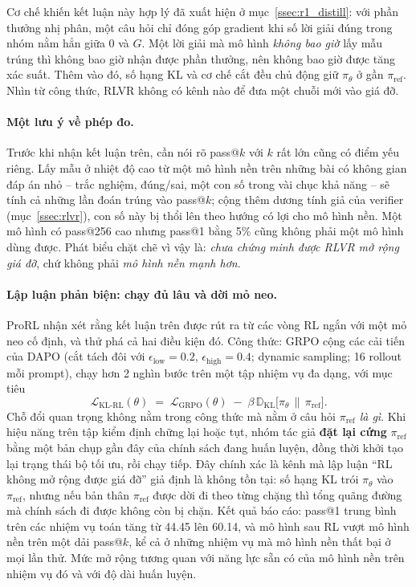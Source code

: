 Cơ chế khiến kết luận này hợp lý đã xuất hiện ở mục~\ref{ssec:r1_distill}: với phần thưởng nhị phân, một câu hỏi chỉ đóng góp gradient khi số lời giải đúng trong nhóm nằm hẳn giữa 0 và $G$. Một lời giải mà mô hình \emph{không bao giờ} lấy mẫu trúng thì không bao giờ nhận được phần thưởng, nên không bao giờ được tăng xác suất. Thêm vào đó, số hạng KL và cơ chế cắt đều chủ động giữ $\pi_\theta$ ở gần $\pi_{\mathrm{ref}}$. Nhìn từ công thức, RLVR không có kênh nào để đưa một chuỗi mới vào giá đỡ.

\paragraph{Một lưu ý về phép đo.}
Trước khi nhận kết luận trên, cần nói rõ pass@$k$ với $k$ rất lớn cũng có điểm yếu riêng. Lấy mẫu ở nhiệt độ cao từ một mô hình nền trên những bài có không gian đáp án nhỏ -- trắc nghiệm, đúng/sai, một con số trong vài chục khả năng -- sẽ tính cả những lần đoán trúng vào pass@$k$; cộng thêm dương tính giả của verifier (mục~\ref{ssec:rlvr}), con số này bị thổi lên theo hướng có lợi cho mô hình nền. Một mô hình có pass@256 cao nhưng pass@1 bằng 5\% cũng không phải một mô hình dùng được. Phát biểu chặt chẽ vì vậy là: \emph{chưa chứng minh được RLVR mở rộng giá đỡ}, chứ không phải \emph{mô hình nền mạnh hơn}.

\paragraph{Lập luận phản biện: chạy đủ lâu và dời mỏ neo.}
ProRL \cite{liu2025prorl} nhận xét rằng kết luận trên được rút ra từ các vòng RL ngắn với một mỏ neo cố định, và thử phá cả hai điều kiện đó. Công thức: GRPO cộng các cải tiến của DAPO (cắt tách đôi với $\epsilon_{\mathrm{low}} = 0.2$, $\epsilon_{\mathrm{high}} = 0.4$; dynamic sampling; 16 rollout mỗi prompt), chạy hơn 2 nghìn bước trên một tập nhiệm vụ đa dạng, với mục tiêu
\[
\mathcal{L}_{\text{KL-RL}}(\theta) \;=\; \mathcal{L}_{\mathrm{GRPO}}(\theta) \;-\; \beta\,\mathbb{D}_{\mathrm{KL}}\big[\pi_\theta\,\big\|\,\pi_{\mathrm{ref}}\big].
\]
Chỗ đổi quan trọng không nằm trong công thức mà nằm ở câu hỏi \emph{$\pi_{\mathrm{ref}}$ là gì}. Khi hiệu năng trên tập kiểm định chững lại hoặc tụt, nhóm tác giả \textbf{đặt lại cứng} $\pi_{\mathrm{ref}}$ bằng một bản chụp gần đây của chính sách đang huấn luyện, đồng thời khởi tạo lại trạng thái bộ tối ưu, rồi chạy tiếp. Đây chính xác là kênh mà lập luận ``RL không mở rộng được giá đỡ'' giả định là không tồn tại: số hạng KL trói $\pi_\theta$ vào $\pi_{\mathrm{ref}}$, nhưng nếu bản thân $\pi_{\mathrm{ref}}$ được dời đi theo từng chặng thì tổng quãng đường mà chính sách đi được không còn bị chặn. Kết quả báo cáo: pass@1 trung bình trên các nhiệm vụ toán tăng từ 44.45 lên 60.14, và mô hình sau RL vượt mô hình nền trên một dải pass@$k$, kể cả ở những nhiệm vụ mà mô hình nền thất bại ở mọi lần thử. Mức mở rộng tương quan với năng lực sẵn có của mô hình nền trên nhiệm vụ đó và với độ dài huấn luyện.

